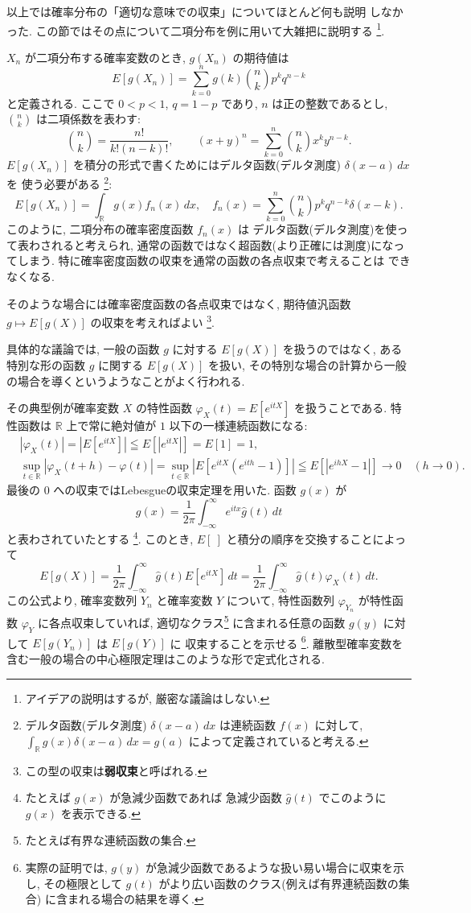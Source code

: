 \documentclass[12pt,twoside]{jarticle}
\newcommand\R{{\mathbb R}} %
\theoremstyle{jplain}
\theoremstyle{jplain}
\theoremstyle{jplain}
\numberwithin{theorem}{section}
\numberwithin{equation}{section}
\numberwithin{figure}{section}
\numberwithin{table}{section}
\begin{document}
以上では確率分布の「適切な意味での収束」についてほとんど何も説明
しなかった. この節ではその点について二項分布を例に用いて大雑把に説明する%
\footnote{アイデアの説明はするが, 厳密な議論はしない.}.

$X_n$ が二項分布する確率変数のとき, $g(X_n)$ の期待値は
\[
E[g(X_n)] = \sum_{k=0}^n g(k) \binom{n}{k}p^k q^{n-k}
\]
と定義される. ここで $0<p<1$, $q=1-p$ であり, $n$ は正の整数であるとし, 
$\binom{n}{k}$ は二項係数を表わす:
\[
\binom{n}{k}
=\frac{n!}{k!(n-k)!}, \qquad
(x+y)^n
=\sum_{k=0}^n \binom{n}{k} x^k y^{n-k}.
\]
$E[g(X_n)]$ を積分の形式で書くためにはデルタ函数(デルタ測度) $\delta(x-a)\,dx$ を
使う必要がある%
\footnote{デルタ函数(デルタ測度) $\delta(x-a)\,dx$ は連続函数 $f(x)$ に対して, 
$\int_\R g(x)\delta(x-a)\,dx = g(a)$ によって定義されていると考える.}: 
\[
E[g(X_n)] = \int_\R g(x)f_n(x)\,dx,
\quad
f_n(x) = \sum_{k=0}^n\binom{n}{k}p^k q^{n-k}\delta(x-k).
\]
このように, 二項分布の確率密度函数 $f_n(x)$ は
デルタ函数(デルタ測度)を使って表わされると考えられ,  
通常の函数ではなく超函数(より正確には測度)になってしまう.
特に確率密度函数の収束を通常の函数の各点収束で考えることは
できなくなる. 

そのような場合には確率密度函数の各点収束ではなく, 
期待値汎函数 $g\mapsto E[g(X)]$ の収束を考えればよい%
\footnote{この型の収束は{\bf 弱収束}と呼ばれる.}.

具体的な議論では, 一般の函数 $g$ に対する $E[g(X)]$ を扱うのではなく, 
ある特別な形の函数 $g$ に関する $E[g(X)]$ を扱い, 
その特別な場合の計算から一般の場合を導くというようなことがよく行われる.

その典型例が確率変数 $X$ の特性函数 $\varphi_X(t)=E[e^{itX}]$ を扱うことである.
特性函数は $\R$ 上で常に絶対値が $1$ 以下の一様連続函数になる:
\begin{align*}
&
|\varphi_X(t)|=\left|E[e^{itX}]\right|\leqq E\left[|e^{itX}|\right] = E[1]=1,
\\ &
\sup_{t\in\R}|\varphi_X(t+h)-\varphi(t)|
=\sup_{t\in\R}|E[e^{itX}(e^{ith}-1)]|
\leqq E\left[|e^{ihX}-1|\right]
\longrightarrow 0 \quad (h\to 0).
\end{align*}
最後の $0$ への収束ではLebesgueの収束定理を用いた.
函数 $g(x)$ が
\[
g(x) = \frac{1}{2\pi}\int_{-\infty}^\infty e^{itx} \widehat{g}(t)\,dt
\]
と表わされていたとする%
\footnote{たとえば $g(x)$ が急減少函数であれば
急減少函数 $\widehat{g}(t)$ でこのように $g(x)$ を表示できる.}. 
このとき, $E[\ ]$ と積分の順序を交換することによって
\[
E[g(X)]
= \frac{1}{2\pi}\int_{-\infty}^\infty \widehat{g}(t) E[e^{itX}]\,dt
= \frac{1}{2\pi}\int_{-\infty}^\infty \widehat{g}(t) \varphi_X(t)\,dt.
\]
この公式より, 確率変数列 $Y_n$ と確率変数 $Y$ について, 
特性函数列 $\varphi_{Y_n}$ が特性函数 $\varphi_Y$ に各点収束していれば, 
適切なクラス\footnote{たとえば有界な連続函数の集合.}%
に含まれる任意の函数 $g(y)$ に対して $E[g(Y_n)]$ は $E[g(Y)]$ に
収束することを示せる%
\footnote{実際の証明では, 
$g(y)$ が急減少函数であるような扱い易い場合に収束を示し, 
その極限として $g(t)$ がより広い函数のクラス(例えば有界連続函数の集合)
に含まれる場合の結果を導く.}.
離散型確率変数を含む一般の場合の中心極限定理はこのような形で定式化される.
\end{document}
